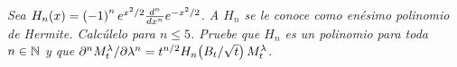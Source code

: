 \emph{
    Sea $H_n\!\left( x\right) =\left( -1\right) ^ne^{x^2/2}\frac{d^n}{dx^n}e^{-x^2/2}$.
    A $H_n$ se le conoce como en\'esimo polinomio de Hermite. Calc\'ulelo para 
    $n\leq 5$. Pruebe que $H_n$ es un polinomio para toda $n\in\mathbb{N}$ y que 
    $\partial^n M^\lambda_t/\partial \lambda^n=t^{n/2}H_n\!\left( B_t/\sqrt{t}\right) M^\lambda_t$.\pn
}

\afterstatement\pn